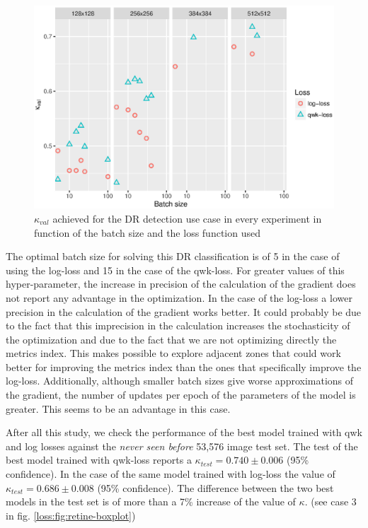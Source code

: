 \begin{figure}[!htb]
	\centering
	\includegraphics[width=\textwidth]{Figures/chapter_loss/retine-results.eps}
	\caption[$QWK_{val}$ vs BS - Diabetic Retinopathy detection use case]{$\kappa_{val}$ achieved for the DR detection use case in every experiment in function of the batch size and the loss function used}
	\label{loss:fig:best}
\end{figure}

The optimal batch size for solving this DR classification is of 5 in the case of using the log-loss and 15 in the case of the qwk-loss. For greater values of this hyper-parameter, the increase in precision of the calculation of the gradient does not report any advantage in the optimization. In the case of the log-loss a lower precision in the calculation of the gradient works better. It could probably be due to the fact that this imprecision in the calculation increases the stochasticity of the optimization and due to the fact that we are not optimizing directly the metrics index. This makes possible to explore adjacent zones that could work better for improving the metrics index than the ones that specifically improve the log-loss. Additionally, although smaller batch sizes give worse approximations of the gradient, the number of updates per epoch of the parameters of the model is greater. This seems to be an advantage in this case.

After all this study, we check the performance of the best model trained with qwk and log losses against the \emph{never seen before} 53,576 image test set. The test of the best model trained with qwk-loss reports a $\kappa_{test} = 0.740 \pm 0.006$ (95\% confidence). In the case of the same model trained with log-loss the value of $\kappa_{test} = 0.686 \pm 0.008$ (95\% confidence). The difference between the two best models in the test set is of more than a 7\% increase of the value of $\kappa$. (see case 3 in fig. \ref{loss:fig:retine-boxplot})

